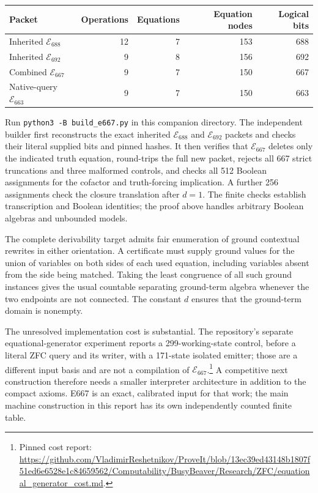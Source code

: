 \begin{center}
\begin{tabular}{lrrrr}
\hline
Packet & Operations & Equations & Equation nodes & Logical bits\\
\hline
Inherited $\mathcal E_{688}$ & 12 & 7 & 153 & 688\\
Inherited $\mathcal E_{692}$ & 9 & 8 & 156 & 692\\
Combined $\mathcal E_{667}$ & 9 & 7 & 150 & 667\\
Native-query $\mathcal E_{663}$ & 9 & 7 & 150 & 663\\
\hline
\end{tabular}
\end{center}

Run \texttt{python3 -B build\_e667.py} in this companion directory.
The independent builder first reconstructs the exact inherited
$\mathcal E_{688}$ and $\mathcal E_{692}$ packets and checks their
literal supplied bits and pinned hashes.  It then verifies that
$\mathcal E_{667}$ deletes only the indicated truth equation,
round-trips the full new packet, rejects all 667 strict truncations
and three malformed controls, and checks all 512 Boolean assignments
for the cofactor and truth-forcing implication.  A further 256
assignments check the closure translation after $d=1$.
The finite checks establish transcription and Boolean identities;
the proof above handles arbitrary Boolean algebras and unbounded models.

The complete derivability target admits fair enumeration of ground
contextual rewrites in either orientation.  A certificate must supply
ground values for the union of variables on both sides of each used
equation, including variables absent from the side being matched.
Taking the least congruence of all such ground instances gives the
usual countable separating ground-term algebra whenever the two
endpoints are not connected.  The constant $d$ ensures that the
ground-term domain is nonempty.

The unresolved implementation cost is substantial.  The repository's
separate equational-generator experiment reports a 299-working-state
control, before a literal ZFC query and its writer, with a 171-state
isolated emitter; those are a different input basis and are not a
compilation of $\mathcal E_{667}$.\footnote{Pinned cost report:
\url{https://github.com/VladimirReshetnikov/ProveIt/blob/13ec39ed43148b1807f51ed6e6528e1c84659562/Computability/BusyBeaver/Research/ZFC/equational_generator_cost.md}.}
A competitive next construction therefore needs a smaller interpreter
architecture in addition to the compact axioms.  E667 is an exact,
calibrated input for that work; the main machine construction in this
report has its own independently counted finite table.

